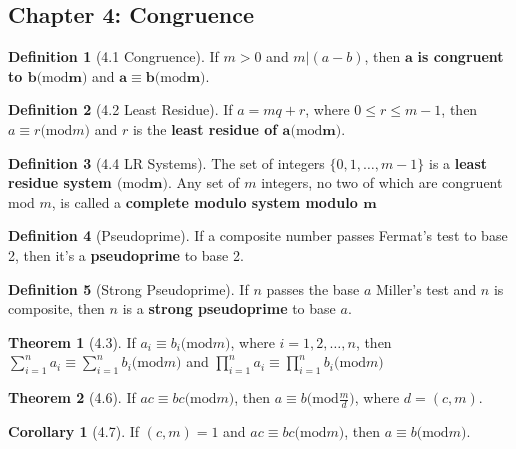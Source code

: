 \documentclass{article}
\renewcommand{\mod}[1]{\ensuremath{(\mathrm{mod}#1})}
\theoremstyle{definition}
\newtheorem*{defn}{Definition}
\newtheorem*{cor}{Corollary}
\newtheorem*{thm}{Theorem}
\theoremstyle{remark}
\begin{document}
    \subsection*{Chapter 4: Congruence}{
        \begin{defn}[4.1 Congruence]
            If $m>0$ and $m|(a-b)$, then $\mathbf{a}$ \textbf{is congruent to $\mathbf{b\mod{m}}$} and $\mathbf{a\equiv b\mod{m}}$.
        \end{defn}
        
        \begin{defn}[4.2 Least Residue]
            If $a=mq+r$, where $0\leq r\leq m-1$, then $a\equiv r\mod{m}$ and $r$ is the \textbf{least residue of $\mathbf{a\mod{m}}$}.
        \end{defn}
        
        \begin{defn}[4.4 LR Systems]
            The set of integers $\{0,1,\ldots,m-1\}$ is a \textbf{least residue system $\mathbf{\mod{m}}$}. Any set of $m$ integers, no two of which are congruent mod $m$, is called a \textbf{complete modulo system modulo $\mathbf{m}$}
        \end{defn}
        
        \begin{defn}[Pseudoprime]
            If a composite number passes Fermat's test to base 2, then it's a \textbf{pseudoprime} to base 2.
        \end{defn}
        
        \begin{defn}[Strong Pseudoprime]
            If $n$ passes the base $a$ Miller's test and $n$ is composite, then $n$ is a \textbf{strong pseudoprime} to base $a$.
        \end{defn}
        
        \begin{thm}[4.3]
            If $a_i \equiv b_i \mod m$, where $i=1,2,\ldots,n$, then $\sum_{i=1}^n a_i \equiv \sum_{i=1}^n b_i \mod m$ and $\prod_{i=1}^n a_i \equiv \prod_{i=1}^n b_i \mod m$
        \end{thm}
        
        \begin{thm}[4.6]
            If $ac \equiv bc\mod{m}$, then $a\equiv b \mod{\frac{m}{d}}$, where $d=(c,m)$.
        \end{thm}
    
        \begin{cor}[4.7]
            If $(c,m)=1$ and $ac\equiv bc \mod m$, then $a\equiv b\mod m$.
        \end{cor}
        
}
\end{document}
